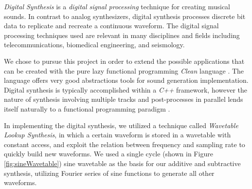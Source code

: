 \documentclass[a0,portrait]{a0poster}
\begin{document}
\begin{sectbox}

\emph{Digital Synthesis} is a \emph{digital signal processing}
technique for creating musical sounds. In contrast to analog synthesizers, digital synthesis processes discrete bit data to replicate and recreate a continuous waveform.
The digital signal processing techniques used are relevant in many disciplines and fields including telecommunications, biomedical engineering, and seismology.

\vspace{1cm}

We chose to pursue this project in order to extend the possible applications that can be created with the pure lazy functional programming \emph{Clean} language \cite{clean}. The language offers very good abstractions tools for sound generation implementation. Digital synthesis is typically accomplished within a \emph{C++} framework, however the nature of synthesis involving multiple tracks and post-processes in parallel lends itself naturally to a functional programming paradigm \cite{organ}.

\vspace{1cm}

In implementing the digital synthesis, we utilized a technique called \emph{Wavetable Lookup Synthesis}, in which a certain waveform is stored in a wavetable with constant access, and exploit the relation between frequency and sampling rate to quickly build new waveforms. We used a single cycle (shown in Figure \ref{fig:sineWavetable}) sine wavetable as the basis for our additive and subtractive synthesis, utilizing Fourier series of sine functions to generate all other waveforms.


\end{sectbox}
\end{document}
